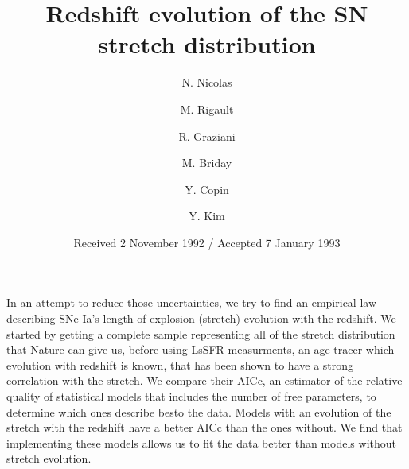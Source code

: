 \documentclass[]{aa} %
\begin{document}
\title{Redshift evolution of the SN stretch distribution}


\author{N. Nicolas
    \and M. Rigault
    \and R. Graziani     
    \and M. Briday
    \and Y. Copin    
    \and Y. Kim
}



\date{Received 2 November 1992 / Accepted 7 January 1993}

    {In an attempt to reduce those uncertainties, we try to find an empirical
    law describing SNe Ia's length of explosion (stretch) evolution with the
redshift.}
    {We started by getting a complete sample representing all of the stretch
        distribution that Nature can give us, before using LsSFR measurments, an
        age tracer which evolution with redshift is known, that has been shown
        to have a strong correlation with the stretch. We compare their AICc, an
    estimator of the relative quality of statistical models that includes the
number of free parameters, to determine which ones describe besto the data.}
    {Models with an evolution of the stretch with the redshift have a better
    AICc than the ones without.}
    {We find that implementing these models allows us to fit the data better
    than models without stretch evolution.}

\maketitle
\end{document}
